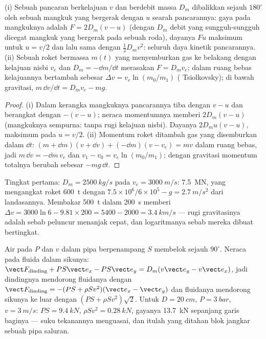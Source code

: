 \begin{proposition}\label{prop:b2:flow-balances:pelton}
(i) Sebuah pancaran berkelajuan $v$ dan berdebit massa $D_m$ dibalikkan sejauh
$180^\circ$ oleh sebuah mangkuk yang bergerak dengan $u$ searah pancarannya: gaya
pada mangkuknya adalah $F = 2D_m(v - u)$ (dengan $D_m$ debit yang sungguh-sungguh
dicegat mangkuk yang bergerak pada sebuah roda), dayanya $Fu$
maksimum untuk $u = v/2$ dan lalu sama dengan $\tfrac12D_mv^2$: seluruh
daya kinetik pancarannya. (ii) Sebuah roket bermassa $m(t)$ yang menyemburkan gas ke belakang dengan
kelajuan nisbi $v_e$ dan  $D_m = -\dd m/\dd t$ merasakan
 $F = D_mv_e$; dalam ruang bebas kelajuannya bertambah sebesar
$\Delta v = v_e\ln(m_0/m_1)$ ( Tsiolkovsky); di bawah gravitasi,
$m\,\dd v/\dd t = D_mv_e - mg$.
\end{proposition}

\begin{proof}
(i) Dalam kerangka mangkuknya pancarannya tiba dengan $v - u$ dan berangkat dengan
$-(v - u)$; neraca momentumnya memberi $2D_m(v - u)$ (mangkuknya
sempurna: tanpa rugi kelajuan nisbi). Dayanya $2D_mu(v - u)$, maksimum pada
$u = v/2$. (ii) Momentum roket ditambah gas yang disemburkan dalam $\dd t$: $(m + \dd m)
(v + \dd v) + (-\dd m)(v - v_e) = mv$ dalam ruang bebas, jadi $m\,\dd v = -\dd m\,v_e$
dan $v_1 - v_0 = v_e\ln(m_0/m_1)$; dengan gravitasi momentum totalnya berubah
sebesar $-mg\,\dd t$.
\end{proof}

\begin{example}\label{ex:b2:flow-balances:rocket}
Tingkat pertama: $D_m = \qty{2500}{kg/s}$ pada $v_e = \qty{3000}{m/s}$: 
\qty{7.5}{MN}, yang mengangkat roket \qty{600}{t} dengan $7.5 \times 10^6/6 \times 10^5 - g
= \qty{2.7}{m/s^2}$ dari landasannya. Membakar \qty{500}{t} dalam \qty{200}{s} memberi
$\Delta v = 3000\ln6 - 9.81 \times 200 = 5400 - 2000 = \qty{3.4}{km/s}$ --- rugi
gravitasinya adalah sebab peluncur menanjak cepat, dan logaritmanya sebab mereka
dibuat bertingkat.
\end{example}

\begin{example}\label{ex:b2:flow-balances:bend}
Air pada $P$ dan $v$ dalam pipa berpenampang $S$ membelok sejauh $90^\circ$. Neraca
pada fluida dalam sikunya: $\vect F_{\text{dinding}} + PS\vect e_x - PS
\vect e_y = D_m(v\vect e_y - v\vect e_x)$, jadi dindingnya mendorong fluidanya dengan
$\vect F_{\text{dinding}} = -(PS + \rho Sv^2)(\vect e_x - \vect e_y)$ dan fluidanya
mendorong sikunya ke luar dengan $(PS + \rho Sv^2)\sqrt2$. Untuk $D = \qty{20}{cm}$,
$P = \qty{3}{bar}$, $v = \qty{3}{m/s}$: $PS = \qty{9.4}{kN}$, $\rho Sv^2 = \qty{0.28}{kN}$,
gayanya \qty{13.7}{kN} sepanjang garis baginya --- suku tekanannya menguasai,
dan itulah yang ditahan blok jangkar sebuah pipa saluran.
\end{example}

